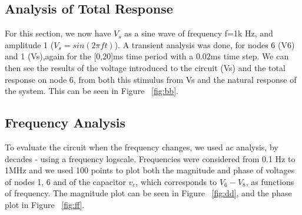 \subsection{Analysis of Total Response}
For this section, we now have $V_s$ as a sine wave of frequency f=1k Hz, and amplitude 1 ($V_s=sin(2\pi f t)$). A transient analysis was done, for nodes 6 (V6) and 1 (Vs),again for the [0,20]ms time period with a 0.02ms time step. We can then see the results of the voltage introduced to the circuit (Vs) and the total response on node 6, from both this stimulus from Vs and the natural response of the system. This can be seen in Figure ~\ref{fig:bb}.\\
\subsection{Frequency Analysis}
To evaluate the circuit when the frequency changes, we used ac analysis, by decades - using a frequency logscale. Frequencies were considered from 0.1 Hz to 1MHz and we used 100 points to plot both the magnitude and phase of voltages of nodes 1, 6 and of the capacitor $v_c$, which corresponds to $V_6 - V_8$, as functions of frequency. The magnitude plot can be seen in Figure ~\ref{fig:dd}, and the phase plot in Figure ~\ref{fig:ff}.\\

